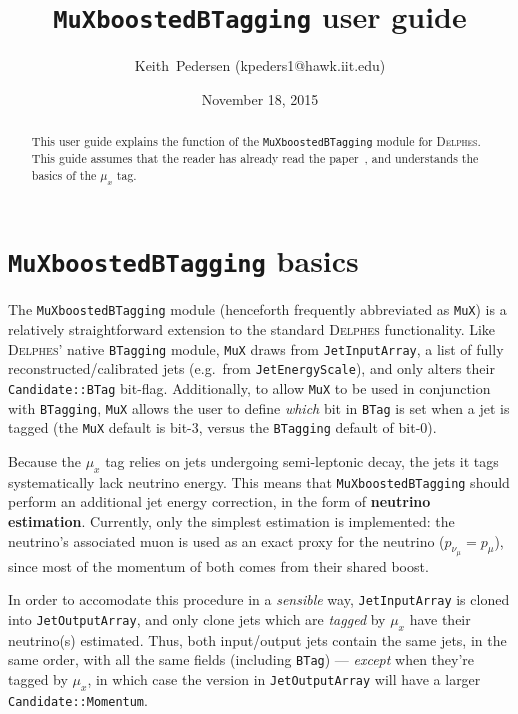 \documentclass[10pt]{article}
\newcommand{\muX}{$\mu_{x}^{}$}
\newcommand{\muXmodFull}{\texttt{MuXboostedBTagging}}
\newcommand{\muXmod}{\texttt{MuX}}
\newcommand{\delphes}{\textsc{Delphes}}
\newcommand{\pMu}[1][]     {p_{\mu}^{#1}}
\newcommand{\pNu}[1][]     {p_{\nu_{\mu}}^{#1}}
\begin{document}
\title{{\muXmodFull} user guide}

\author{Keith~Pedersen (kpeders1@hawk.iit.edu)}

\date{November 18, 2015}

\maketitle

\begin{abstract}
This user guide explains the function of the {\muXmodFull} module for
{\delphes}. This guide assumes that the reader has already read the
paper~\cite{Pedersen:MuX}, and understands the basics of the {\muX} tag.
\end{abstract}

\section{{\muXmodFull} basics}
The {\muXmodFull} module (henceforth frequently abbreviated as {\muXmod})
is a relatively straightforward extension to the standard {\delphes}
functionality. Like {\delphes}' native \texttt{BTagging} module, {\muXmod}
draws from \texttt{JetInputArray}, a list of fully reconstructed/calibrated
jets (e.g.\ from \texttt{JetEnergyScale}), and only alters their
\texttt{Candidate::BTag} bit-flag. Additionally, to allow {\muXmod} to be used
in conjunction with \texttt{BTagging}, {\muXmod} allows the user to define
\emph{which} bit in \texttt{BTag} is set when a jet is tagged (the {\muXmod}
default is bit-3, versus the \texttt{BTagging} default of bit-0).

Because the {\muX} tag relies on jets undergoing semi-leptonic decay, the jets
it tags systematically lack neutrino energy. This means that {\muXmodFull}
should perform an additional jet energy correction, in the form of
\textbf{neutrino estimation}. Currently, only the simplest estimation is
implemented: the neutrino's associated muon is used as an exact proxy for the
neutrino ($\pNu=\pMu$), since most of the momentum of both comes from their
shared boost.

In order to accomodate this procedure in a \emph{sensible} way,
\texttt{JetInputArray} is cloned into \texttt{JetOutputArray}, and
only clone jets which are \emph{tagged} by {\muX} have their neutrino(s)
estimated. Thus, both input/output jets contain the same jets, in the same
order, with all the same fields (including \texttt{BTag}) --- \emph{except} when
they're tagged by {\muX}, in which case the version in \texttt{JetOutputArray}
will have a larger \texttt{Candidate::Momentum}.
\end{document}
